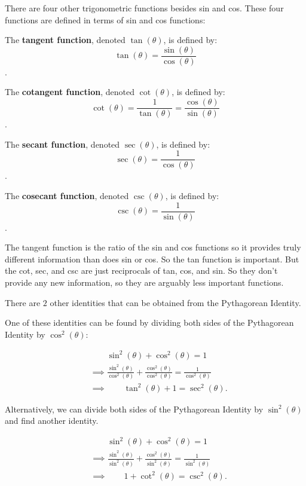 \label{les_5:part_2_intro_to_trig_functions}

There are four other trigonometric functions besides sin and cos. These four
functions are defined in terms of sin and cos functions:

\begin{definition}
  \label{def:the_other_4_trig_functions}

  The \textbf{tangent function}, denoted $\tan (\theta)$, is defined by:
  \[ \tan (\theta) = \frac{\sin (\theta)}{\cos (\theta)} \].

  The \textbf{cotangent function}, denoted $\cot (\theta)$, is defined by:
  \[ \cot (\theta) = \frac{1}{\tan (\theta)} = \frac{\cos (\theta)}{\sin (\theta)} \].

  The \textbf{secant function}, denoted $\sec (\theta)$, is defined by:
  \[ \sec (\theta) = \frac{1}{\cos (\theta)} \]. 

  The \textbf{cosecant function}, denoted $\csc (\theta)$, is defined by:
  \[ \csc (\theta) = \frac{1}{\sin (\theta)} \].
\end{definition}

The tangent function is the ratio of the sin and cos functions so it provides
truly different information than does sin or cos. So the tan function is
important. But the cot, sec, and csc are just reciprocals of tan, cos, and sin.
So they don't provide any new information, so they are arguably less important
functions.

There are $2$ other identities that can be obtained from the Pythagorean
Identity.

One of these identities can be found by dividing both sides of the Pythagorean
Identity by $\cos^{2} (\theta)$:

\begin{align*}
  &\qquad\sin^{2} (\theta) + \cos^{2} (\theta) = 1 \\
  &\implies \frac{\sin^{2} (\theta)}{\cos^{2} (\theta)} + \frac{\cos^{2} (\theta)}{\cos^{2} (\theta)} = \frac{1}{\cos^{2} (\theta)} \\
  &\implies \qquad \tan^{2} (\theta) + 1 = \sec^{2} (\theta)
.\end{align*}

Alternatively, we can divide both sides of the Pythagorean Identity by $\sin^{2}
(\theta)$ and find another identity.

\begin{align*}
  &\qquad\sin^{2} (\theta) + \cos^{2} (\theta) = 1 \\
  &\implies \frac{\sin^{2} (\theta)}{\sin^{2} (\theta)} + \frac{\cos^{2}
  (\theta)}{\sin^{2} (\theta)} = \frac{1}{\sin^{2} (\theta)} \\
  &\implies \qquad 1 + \cot^{2} (\theta) = \csc^{2} (\theta)
.\end{align*}

